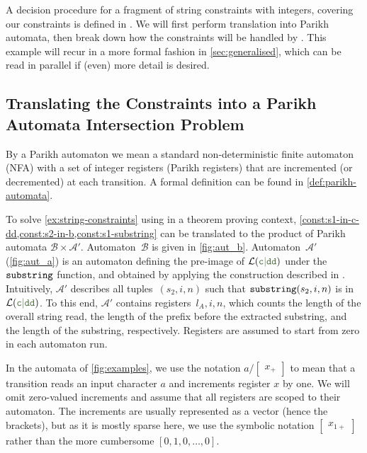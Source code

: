 A decision procedure for a fragment of string constraints with integers,
covering our constraints is defined in
\cite{ostrich-plus}.
%
We will first perform translation into Parikh
automata, then break down how the constraints will be handled by \Calculus{}.
This example will recur in a more formal fashion in \cref{sec:generalised},
which can be read in parallel if (even) more detail is desired.

\subsection{Translating the Constraints into a Parikh Automata Intersection Problem}

By a Parikh automaton we mean a standard non-deterministic finite automaton
(NFA) with a set of integer registers (Parikh registers) that are incremented
(or decremented) at each transition. A formal definition can be found in
\cref{def:parikh-automata}.

To solve \cref{ex:string-constraints} using \Calculus{} in a theorem
proving context,
\cref{const:s1-in-c-dd,const:s2-in-b,const:s1-substring} can be
translated to the product of Parikh automata $\mathcal{B} \times
\mathcal{A}'$. Automaton~$\mathcal{B}$ is given in \cref{fig:aut_b}.  Automaton~$\mathcal{A}'$
(\cref{fig:aut_a}) is an automaton defining the pre-image of
$\Language(\Regex{c\RegexOr{}dd})$ under the $\operatorname{\mathtt{substring}}$ function,
and obtained by applying the construction described in
\cite{ostrich-plus}. Intuitively, $\mathcal{A}'$ describes all
tuples~$(s_2, i, n)$ such that $\operatorname{\mathtt{substring}}(s_2, i, n)$ is in
$\Language(\Regex{c\RegexOr{}dd})$. To this end, $\mathcal{A}'$ contains
registers~$l_A, i, n$, which counts the length of the overall string
read, the length of the prefix before the extracted substring, and the
length of the substring, respectively. Registers are assumed to start
from zero in each automaton run.

In the automata of \cref{fig:examples}, we use the notation $a /
\begin{bmatrix} x_+ \end{bmatrix}$ to mean that a transition reads an input
character $a$ and increments register $x$ by one. We will omit zero-valued
increments and assume that all registers are scoped to their automaton. The
increments are usually represented as a vector (hence the brackets), but as it
is mostly sparse here, we use the symbolic notation $\begin{bmatrix} x_{1+}
\end{bmatrix}$ rather than the more cumbersome $\left[ 0, 1,  0 , \ldots, 0
\right]$.

